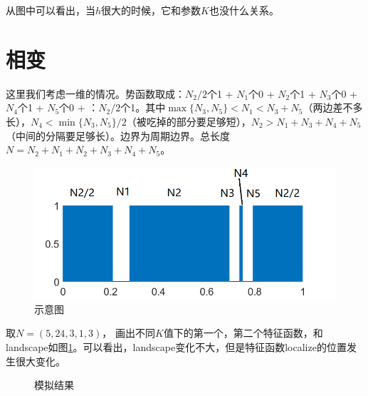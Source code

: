 \documentclass[12pt,a4paper]{article}
\begin{document}
从图中可以看出，当$h$很大的时候，它和参数$K$也没什么关系。

\newpage
\section{相变}

这里我们考虑一维的情况。势函数取成：$N_2/2$个1 + $N_1$个0 + $N_2$个1 +  $N_3$个0 +  $N_4$个1 +  $N_5$个0 + ：$N_2/2$个1。其中$\max\{N_3, N_5\} < N_1 < N_3 + N_5$（两边差不多长），$N_4 < \min\{N_3, N_5\} / 2$（被吃掉的部分要足够短），$N_2 > N_1+ N_3 + N_4 + N_5$（中间的分隔要足够长）。边界为周期边界。总长度$N = N_2 + N_1 + N_2 + N_3 + N_4 + N_5$。
\begin{figure}[h]
\centering
\includegraphics[width=0.7\linewidth]{N}
\caption{示意图}
\end{figure}


取$N=(5,24,3,1,3)$，
画出不同$K$值下的第一个，第二个特征函数，和landscape如图\ref{f3}。可以看出，landscape变化不大，但是特征函数localize的位置发生很大变化。
\begin{figure}[h]
\centering
{}
\caption{模拟结果}
\label{f3}
\end{figure}
\end{document}
